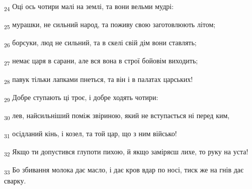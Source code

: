\begin{tcolorbox}
\textsubscript{24} Оці ось чотири малі на землі, та вони вельми мудрі:
\end{tcolorbox}
\begin{tcolorbox}
\textsubscript{25} мурашки, не сильний народ, та поживу свою заготовлюють літом;
\end{tcolorbox}
\begin{tcolorbox}
\textsubscript{26} борсуки, люд не сильний, та в скелі свій дім вони ставлять;
\end{tcolorbox}
\begin{tcolorbox}
\textsubscript{27} немає царя в сарани, але вся вона в строї бойовім виходить;
\end{tcolorbox}
\begin{tcolorbox}
\textsubscript{28} павук тільки лапками пнеться, та він і в палатах царських!
\end{tcolorbox}
\begin{tcolorbox}
\textsubscript{29} Добре ступають ці троє, і добре ходять чотири:
\end{tcolorbox}
\begin{tcolorbox}
\textsubscript{30} лев, найсильніший поміж звіриною, який не вступається ні перед ким,
\end{tcolorbox}
\begin{tcolorbox}
\textsubscript{31} осідланий кінь, і козел, та той цар, що з ним військо!
\end{tcolorbox}
\begin{tcolorbox}
\textsubscript{32} Якщо ти допустився глупоти пихою, й якщо заміряєш лихе, то руку на уста!
\end{tcolorbox}
\begin{tcolorbox}
\textsubscript{33} Бо збивання молока дає масло, і дає кров вдар по носі, тиск же на гнів дає сварку.
\end{tcolorbox}
